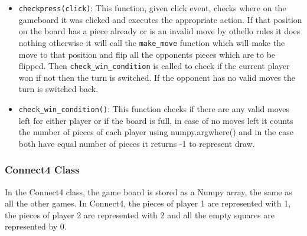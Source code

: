 \documentclass[12pt, letter]{article}
\begin{document}
\begin{itemize}
    \item \texttt{checkpress(click)}: This function, given click event, checks where on the gameboard it was clicked and executes the appropriate action. If that position on the board has a piece already or is an invalid move by othello rules it does nothing otherwise  it will call the \texttt{make\_move} function which will make the move to that position and flip all the opponents pieces which are to be flipped. Then \texttt{check\_win\_condition} is called to check if the current player won if not then the turn is switched. If the opponent has no valid moves the turn is switched back.
    \item \texttt{check\_win\_condition()}: This function checks if there are any valid moves left for either player or if the board is full, in case of no moves left it counts the number of pieces of each player using numpy.argwhere() and in the case both have equal number of pieces it returns -1 to represent draw.
\end{itemize}
\subsubsection{Connect4 Class}
In the Connect4 class, the game board is stored as a Numpy array, the same as all the other games. In Connect4, the pieces of player 1 are represented with 1, the pieces of player 2 are represented with 2 and all the empty squares are represented by 0.
\end{document}
